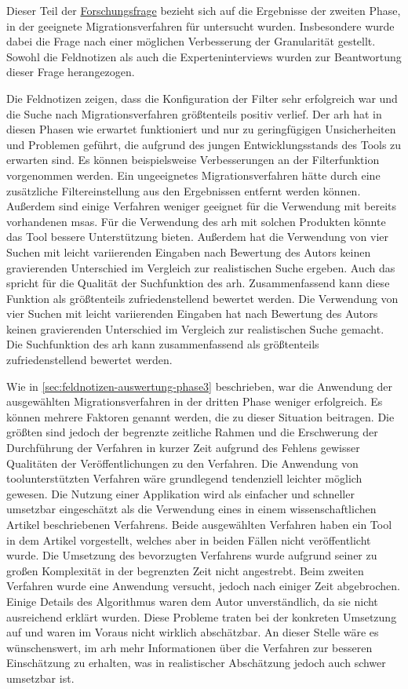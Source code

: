 Dieser Teil der \hyperref[forschungsfrage:1]{Forschungsfrage} bezieht sich auf die Ergebnisse der zweiten Phase, in der geeignete Migrationsverfahren für \jf untersucht wurden.
Insbesondere wurde dabei die Frage nach einer möglichen Verbesserung der Granularität gestellt.
Sowohl die Feldnotizen als auch die Experteninterviews wurden zur Beantwortung dieser Frage herangezogen.

Die Feldnotizen zeigen, dass die Konfiguration der Filter sehr erfolgreich war und die Suche nach Migrationsverfahren größtenteils positiv verlief.
Der \gls{arh} hat in diesen Phasen wie er\-war\-tet funktioniert und nur zu geringfügigen Unsicherheiten und Problemen geführt, die aufgrund des jungen Entwicklungsstands des Tools zu erwarten sind.
Es können beispielsweise Verbesserungen an der Filterfunktion vorgenommen werden.
Ein ungeeignetes Migrationsverfahren hätte durch eine zusätzliche Filtereinstellung aus den Ergebnissen entfernt werden können.
Außerdem sind einige Verfahren weniger geeignet für die Verwendung mit bereits vorhandenen \glspl{msa}.
Für die Verwendung des \gls{arh} mit solchen Produkten könnte das Tool bessere Unterstützung bieten.
Außerdem hat die Verwendung von vier Suchen mit leicht variierenden Eingaben nach Bewertung des Autors keinen gravierenden Unterschied im Vergleich zur realistischen Suche ergeben.
Auch das spricht für die Qualität der Suchfunktion des \gls{arh}.
Zusammenfassend kann diese Funktion als größtenteils zufriedenstellend bewertet werden.
Die Verwendung von vier Suchen mit leicht variierenden Eingaben hat nach Bewertung des Autors keinen gravierenden Unterschied im Vergleich zur realistischen Suche gemacht.
Die Suchfunktion des \gls{arh} kann zusammenfassend als größtenteils zufriedenstellend bewertet werden.

Wie in \cref{sec:feldnotizen-auswertung-phase3} beschrieben, war die Anwendung der ausgewählten Migrationsverfahren in der dritten Phase weniger erfolgreich.
Es können mehrere Faktoren genannt werden, die zu dieser Situation beitragen.
Die größten sind jedoch der begrenzte zeitliche Rahmen und die Erschwerung der Durchführung der Verfahren in kurzer Zeit aufgrund des Fehlens gewisser Qualitäten der Veröffentlichungen zu den Verfahren.
Die Anwendung von toolunterstützten Verfahren wäre grundlegend tendenziell leichter möglich gewesen.
Die Nutzung einer Applikation wird als einfacher und schneller umsetzbar eingeschätzt als die Verwendung eines in einem wissenschaftlichen Artikel beschriebenen Verfahrens.
Beide ausgewählten Verfahren haben ein Tool in dem Artikel vorgestellt, welches aber in beiden Fällen nicht veröffentlicht wurde.
Die Umsetzung des bevorzugten Verfahrens wurde aufgrund seiner zu großen Komplexität in der begrenzten Zeit nicht angestrebt.
Beim zweiten Verfahren wurde eine Anwendung versucht, jedoch nach einiger Zeit abgebrochen.
Einige Details des Algorithmus waren dem Autor unverständlich, da sie nicht ausreichend erklärt wurden.
Diese Probleme traten bei der konkreten Umsetzung auf und waren im Voraus nicht wirklich abschätzbar.
An dieser Stelle wäre es wünschenswert, im \gls{arh} mehr Informationen über die Verfahren zur besseren Einschätzung zu erhalten, was in realistischer Abschätzung jedoch auch schwer umsetzbar ist.

